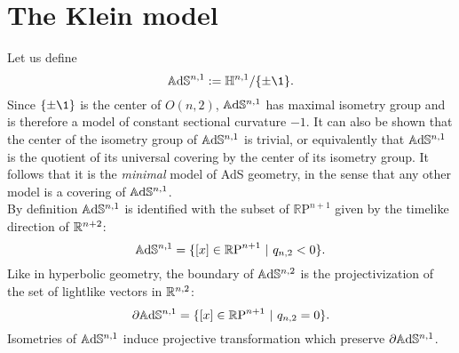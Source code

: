 \section{The Klein model}
Let us define
\[
\A^{n,1} := \H^{n,1} / \{ \pm \1 \}.
\]
Since $\{ \pm \1 \}$ is the center of $O(n,2)$, $\mathbb{A}\mathrm{d}\mathbb{S}^{n,1}$ has maximal isometry group and is therefore a model of constant sectional curvature $-1$.
It can also be shown that the center of the isometry group of $\mathbb{A}\mathrm{d}\mathbb{S}^{n,1}$ is trivial, or equivalently that $\mathbb{A}\mathrm{d}\mathbb{S}^{n,1}$ is the quotient of its universal covering by the center of its isometry group. 
It follows that it is the \emph{minimal} model of AdS geometry, in the sense that any other model is a covering of $\mathbb{A}\mathrm{d}\mathbb{S}^{n,1}$.\\
By definition $\mathbb{A}\mathrm{d}\mathbb{S}^{n,1}$ is identified with the subset of $\mathbb{R} \text{P}^{n+1}$ given by the timelike direction of $\mathbb{R}^{n+2}$:
\[
\mathbb{A}\mathrm{d}\mathbb{S}^{n,1} = \{ \left[ x \right]\in \mathbb{R} \text{P}^{n+1} \ | \ q_{n,2}<0  \}.
\]
Like in hyperbolic geometry, the boundary of $\mathbb{A}\mathrm{d}\mathbb{S}^{n,2}$ is the projectivization of the set of lightlike vectors in $\mathbb{R}^{n,2}$:
\[
\partial\mathbb{A}\mathrm{d}\mathbb{S}^{n,1} = \{ \left[ x \right]\in \mathbb{R} \text{P}^{n+1} \ | \ q_{n,2}=0  \}.
\]
Isometries of $\mathbb{A}\mathrm{d}\mathbb{S}^{n,1}$ induce projective transformation which preserve $\partial \mathbb{A}\mathrm{d}\mathbb{S}^{n,1}$.\\

